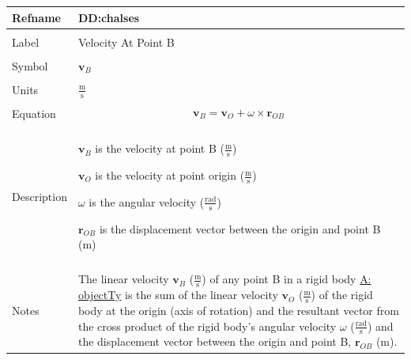 \documentclass[12pt]{article}
\begin{document}
\noindent \begin{minipage}{\textwidth}
\begin{tabular}{p{} p{}}
\toprule \textbf{Refname} & \textbf{DD:chalses}
\label{DD:chalses}
\\ \midrule \\
Label & Velocity At Point B
        \\ \midrule \\
        Symbol & ${\mathbf{v}_{B}}$
                 \\ \midrule \\
                 Units & $\frac{\text{m}}{\text{s}}$
                         \\ \midrule \\
                         Equation & \begin{displaymath}
                                    {\mathbf{v}_{B}}={\mathbf{v}_{O}}+ω\times{\mathbf{r}_{OB}}
                                    \end{displaymath}
                                    \\ \midrule \\
                                    Description & \begin{symbDescription}
                                                  \item{${\mathbf{v}_{B}}$ is the velocity at point B ($\frac{\text{m}}{\text{s}}$)}
                                                  \item{${\mathbf{v}_{O}}$ is the velocity at point origin ($\frac{\text{m}}{\text{s}}$)}
                                                  \item{$ω$ is the angular velocity ($\frac{\text{rad}}{\text{s}}$)}
                                                  \item{${\mathbf{r}_{OB}}$ is the displacement vector between the origin and point B (m)}
                                                  \end{symbDescription}
                                                  \\ \midrule \\
                                                  Notes & The linear velocity ${\mathbf{v}_{B}}$ ($\frac{\text{m}}{\text{s}}$) of any point B in a rigid body \hyperref[assumpOT]{A: objectTy} is the sum of the linear velocity ${\mathbf{v}_{O}}$ ($\frac{\text{m}}{\text{s}}$) of the rigid body at the origin (axis of rotation) and the resultant vector from the cross product of the rigid body's angular velocity $ω$ ($\frac{\text{rad}}{\text{s}}$) and the displacement vector between the origin and point B, ${\mathbf{r}_{OB}}$ (m).

\end{tabular}
\end{minipage}
\end{document}

